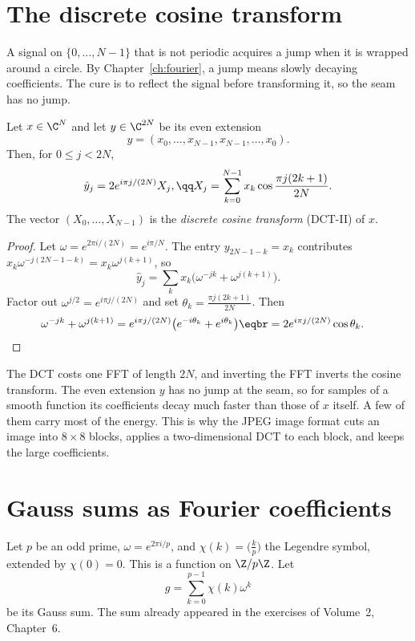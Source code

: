 \section{The discrete cosine transform}

A signal on $\{0,\dots,N-1\}$ that is not periodic acquires a jump when it is wrapped around a circle. By Chapter~\ref{ch:fourier}, a jump means slowly decaying coefficients. The cure is to reflect the signal before transforming it, so the seam has no jump.

\begin{proposition}\label{prop:dct}
Let $x\in\C^N$ and let $y\in\C^{2N}$ be its even extension
\[
y=(x_0,\dots,x_{N-1},x_{N-1},\dots,x_0).
\]
Then, for $0\le j<2N$,
\[
\begin{gathered}\hat y_j=2e^{i\pi j/(2N)}X_j,\qq X_j=\sum_{k=0}^{N-1}x_k\cos\frac{\pi j(2k+1)}{2N}.\end{gathered}
\]
The vector $(X_0,\dots,X_{N-1})$ is the \emph{discrete cosine transform} (DCT-II) of $x$.
\end{proposition}
\begin{proof}
Let $\omega=e^{2\pi i/(2N)}=e^{i\pi/N}$. The entry $y_{2N-1-k}=x_k$ contributes $x_k\omega^{-j(2N-1-k)}=x_k\omega^{j(k+1)}$, so
\[
\hat y_j=\sum_k x_k\bigl(\omega^{-jk}+\omega^{j(k+1)}\bigr).
\]
Factor out $\omega^{j/2}=e^{i\pi j/(2N)}$ and set $\theta_k=\frac{\pi j(2k+1)}{2N}$. Then
\[
\begin{aligned}\omega^{-jk}+\omega^{j(k+1)}&=e^{i\pi j/(2N)}\bigl(e^{-i\theta_k}+e^{i\theta_k}\bigr)\eqbr=2e^{i\pi j/(2N)}\cos\theta_k.\end{aligned}
\]
\end{proof}

The DCT costs one FFT of length $2N$, and inverting the FFT inverts the cosine transform. The even extension $y$ has no jump at the seam, so for samples of a smooth function its coefficients decay much faster than those of $x$ itself. A few of them carry most of the energy. This is why the JPEG image format cuts an image into $8\times8$ blocks, applies a two-dimensional DCT to each block, and keeps the large coefficients.

\section{Gauss sums as Fourier coefficients}

Let $p$ be an odd prime, $\omega=e^{2\pi i/p}$, and $\chi(k)=\bigl(\frac kp\bigr)$ the Legendre symbol, extended by $\chi(0)=0$. This is a function on $\Z/p\Z$. Let
\[
g=\sum_{k=0}^{p-1}\chi(k)\omega^k
\]
be its Gauss sum. The sum already appeared in the exercises of Volume~2, Chapter~6.

